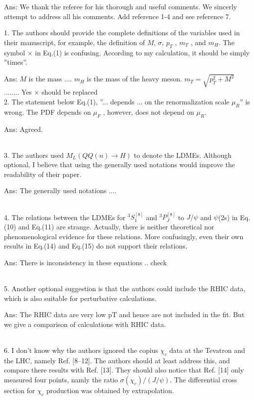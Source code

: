 \documentclass[aps,prc,preprint]{revtex4}
\begin{document}
Ans: We thank the referee for his thorough and useful comments. We sincerly attempt
to address all his comments.
Add reference 1-4 and see reference 7. 


1. The authors should provide the complete definitions of the variables used in their
manuscript, for example, the definition of $M$, $\sigma$, $p_T$ , $m_T$ , and $m_H$. 
The symbol $\times$ in Eq.(1) is confusing. According to my calculation, it should be 
simply ”times”.

Ans: $M$ is the mass ....   $m_H$ is the mass of the heavy meson. 
$m_T=\sqrt{p_T^2 + M^2}$ ........
 Yes $\times$ should be replaced 
\ \\

2. The statement below Eq.(1), ”... depends ... on the renormalization scale $\mu_R$” 
is wrong. The PDF depends on $\mu_F$ , however, does not depend on $\mu_R$.

Ans: Agreed.

\ \\

3. The authors used $M_L(QQ(n) \rightarrow H)$ to denote the LDMEs. Although optional, 
I believe that using the generally used notations would improve the readability of 
their paper.

Ans: The generally used notations ....

\ \\

4. The relations between the LDMEs for $^3S_1^{[8]}$ and $^3P^{[8]}_J$ to $J/\psi$  
and  $\psi$(2s) in Eq.(10) and Eq.(11) are strange. Actually, there is neither 
theoretical nor phenomenological evidence for these relations. More confusingly, 
even their own results in Eq.(14) and Eq.(15) do not support their relations.

Ans: There is inconsistency in these equations .. check

\ \\

5. Another optional suggestion is that the authors could include the RHIC data, 
which is also suitable for perturbative calculations.

Ans: The RHIC data are very low pT and hence are not included in the fit.
  But we give a comparison of calculations with RHIC data.

\ \\


6. I don’t know why the authors ignored the copius $\chi_c$ data at the Tevatron 
and the LHC, namely Ref. [8–12]. The authors should at least address this, and 
compare there results with Ref. [13]. They should also notice that Ref. [14] only 
measured four points, namly the ratio $\sigma(\chi_c)/(J/\psi)$. The differential 
cross section for $\chi_c$ production was obtained by extrapolation.
\end{document}
